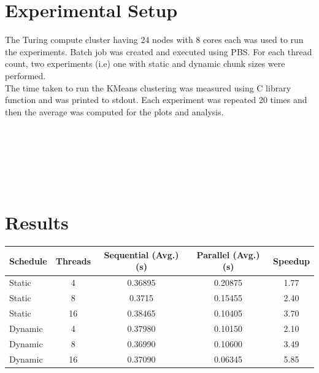 \documentclass[11pt,a4paper,oneside]{article}
\begin{document}
	\section{Experimental Setup}
	The Turing compute cluster having 24 nodes with 8 cores each was used to run the experiments. Batch job was created and executed using PBS. For each thread count, two experiments (i.e) one with static and dynamic chunk sizes were performed. \\
	\newline
	The time taken to run the KMeans clustering was measured using C library function and was printed to stdout. Each experiment was repeated 20 times and then the average was computed for the plots and analysis. \\
	\newline
	\begin{verbatim}
	
	
			
				
	
	\end{verbatim}
	
	\section{Results}
	
	  \begin{center}
		\begin{tabular}{|l|c|c|c|c|}
			\hline 
			\textbf{Schedule} & \textbf{Threads}  & \textbf{Sequential (Avg.) (s)} & \textbf{Parallel (Avg.) (s)} & \textbf{Speedup} \\
			\hline
		    Static & 4 &  0.36895 & 0.20875 & 1.77\\ 
			\hline 
		     Static & 8 &  0.3715 & 0.15455 & 2.40\\
			\hline 
			 Static & 16 &  0.38465 & 0.10405 & 3.70\\
			\hline 
			 Dynamic & 4 &  0.37980 & 0.10150 & 2.10\\ 
			\hline 
			Dynamic & 8 &  0.36990 & 0.10600 & 3.49 \\
			\hline 
			Dynamic & 16 &  0.37090 & 0.06345 & 5.85\\
			\hline 
		\end{tabular}
	\end{center}
	
\end{document}
